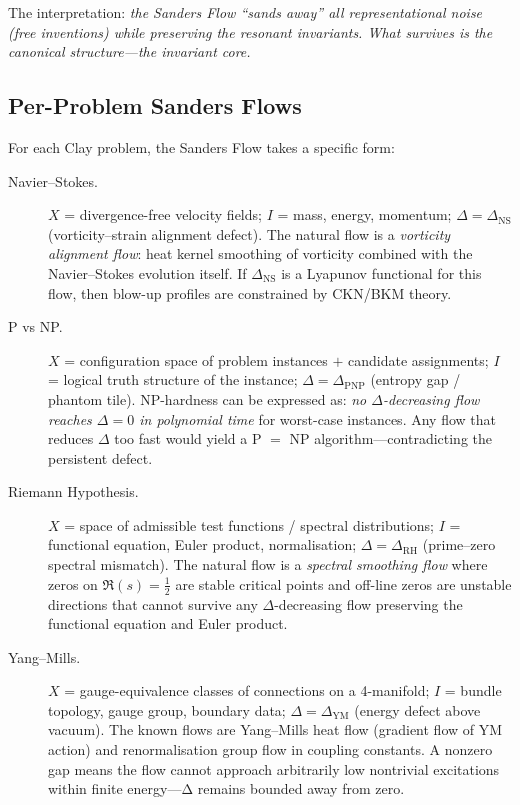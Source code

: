 \documentclass[12pt, openany]{book}
\theoremstyle{remark}
\begin{document}
\noindent
The interpretation: \emph{the Sanders Flow ``sands away'' all representational noise
(free inventions) while preserving the resonant invariants.  What survives is the
canonical structure---the invariant core.}

\subsection{Per-Problem Sanders Flows}
\label{sec:per-problem-flows}

For each Clay problem, the Sanders Flow takes a specific form:

\begin{description}

\item[Navier--Stokes.]
$X$ = divergence-free velocity fields; $I$ = mass, energy, momentum;
$\Delta = \Delta_{\mathrm{NS}}$ (vorticity--strain alignment defect).
The natural flow is a \emph{vorticity alignment flow}: heat kernel smoothing of
vorticity combined with the Navier--Stokes evolution itself.  If $\Delta_{\mathrm{NS}}$
is a Lyapunov functional for this flow, then blow-up profiles are constrained by
CKN/BKM theory.

\item[P vs NP.]
$X$ = configuration space of problem instances $+$ candidate assignments;
$I$ = logical truth structure of the instance;
$\Delta = \Delta_{\mathrm{PNP}}$ (entropy gap / phantom tile).
NP-hardness can be expressed as: \emph{no $\Delta$-decreasing flow reaches
$\Delta = 0$ in polynomial time} for worst-case instances.  Any flow that reduces
$\Delta$ too fast would yield a P $=$ NP algorithm---contradicting the persistent
defect.

\item[Riemann Hypothesis.]
$X$ = space of admissible test functions / spectral distributions;
$I$ = functional equation, Euler product, normalisation;
$\Delta = \Delta_{\mathrm{RH}}$ (prime--zero spectral mismatch).
The natural flow is a \emph{spectral smoothing flow} where zeros on $\Re(s) = \tfrac{1}{2}$
are stable critical points and off-line zeros are unstable directions that cannot survive
any $\Delta$-decreasing flow preserving the functional equation and Euler product.

\item[Yang--Mills.]
$X$ = gauge-equivalence classes of connections on a 4-manifold;
$I$ = bundle topology, gauge group, boundary data;
$\Delta = \Delta_{\mathrm{YM}}$ (energy defect above vacuum).
The known flows are Yang--Mills heat flow (gradient flow of YM action) and
renormalisation group flow in coupling constants.  A nonzero gap means the flow
cannot approach arbitrarily low nontrivial excitations within finite energy---Δ
remains bounded away from zero.


\end{description}
\end{document}
